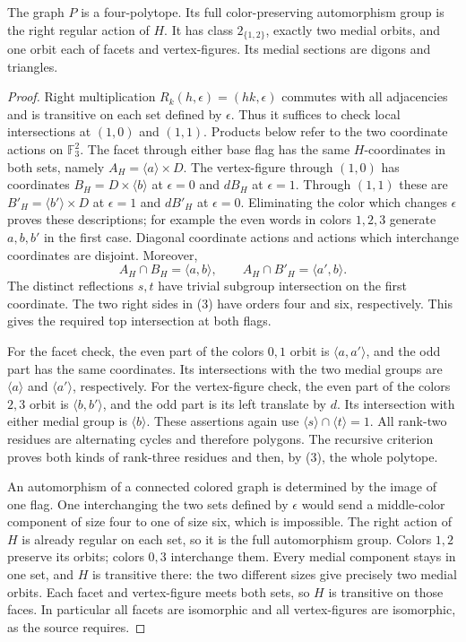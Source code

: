 \documentclass[a4paper,11pt]{article}
\newcommand{\gen}[1]{\langle#1\rangle}
\newcommand{\F}{\mathbb F_3}
\begin{document}
\begin{lemma}\label{input}
The graph $P$ is a four-polytope. Its full color-preserving automorphism
group is the right regular action of $H$. It has class $2_{\{1,2\}}$,
exactly two medial orbits, and one orbit each of facets and vertex-figures.
Its medial sections are digons and triangles.
\end{lemma}
\begin{proof}
Right multiplication $R_k(h,\epsilon)=(hk,\epsilon)$ commutes with
all adjacencies and is transitive on each set defined by $\epsilon$.
Thus it suffices to check local intersections at $(1,0)$ and $(1,1)$.
Products below refer to the two coordinate actions on $\F^2$.
The facet through either base flag has the same $H$-coordinates in both
sets, namely $A_H=\gen a\times D$.
The vertex-figure through $(1,0)$ has coordinates
$B_H=D\times\gen b$ at $\epsilon=0$ and $dB_H$ at $\epsilon=1$.
Through $(1,1)$ these are $B'_H=\gen{b'}\times D$ at $\epsilon=1$
and $dB'_H$ at $\epsilon=0$. Eliminating the color which changes
$\epsilon$ proves these descriptions; for example the even words in
colors $1,2,3$ generate $a,b,b'$ in the first case.
Diagonal coordinate actions and actions which interchange coordinates
are disjoint. Moreover,
\[
 A_H\cap B_H=\gen{a,b},\qquad
 A_H\cap B'_H=\gen{a',b}.                          \tag{3}
\]
The distinct reflections $s,t$ have trivial subgroup intersection on
the first coordinate. The two right sides in (3) have orders four and
six, respectively. This gives the required top intersection at both flags.

For the facet check, the even part of the colors $0,1$ orbit is
$\gen{a,a'}$, and the odd part has the same coordinates.
Its intersections with the two medial groups are $\gen a$ and
$\gen{a'}$, respectively. For the vertex-figure check, the even part
of the colors $2,3$ orbit is $\gen{b,b'}$, and the odd part is its
left translate by $d$. Its intersection with either medial group is
$\gen b$. These assertions again use $\gen s\cap\gen t=1$.
All rank-two residues are alternating cycles and therefore polygons.
The recursive criterion proves both kinds of rank-three residues and
then, by (3), the whole polytope.

An automorphism of a connected colored graph is determined by the
image of one flag. One interchanging the two sets defined by $\epsilon$
would send a middle-color component of size four to one of size six,
which is impossible. The right action of $H$ is already regular on each
set, so it is the full automorphism group. Colors $1,2$ preserve its
orbits; colors $0,3$ interchange them. Every medial component stays in
one set, and $H$ is transitive there: the two different sizes give
precisely two medial orbits. Each facet and vertex-figure meets both
sets, so $H$ is transitive on those faces. In particular all facets are
isomorphic and all vertex-figures are isomorphic, as the source requires.
\end{proof}
\end{document}
